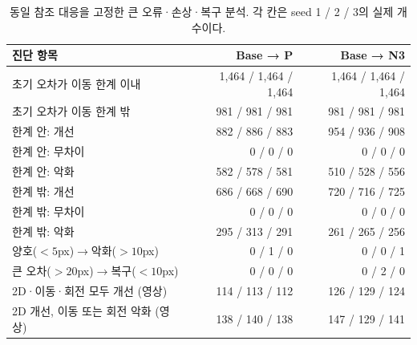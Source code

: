\begin{table}[t]
\centering\footnotesize
\caption{동일 참조 대응을 고정한 큰 오류·손상·복구 분석. 각 칸은 seed 1 / 2 / 3의 실제 개수이다.}
\label{sup:tail}
\setlength{\tabcolsep}{3pt}
\begin{tabularx}{\textwidth}{Yrr}
\toprule
진단 항목 & Base → P & Base → N3 \\
\midrule
초기 오차가 이동 한계 이내 & 1,464 / 1,464 / 1,464 & 1,464 / 1,464 / 1,464 \\
초기 오차가 이동 한계 밖 & 981 / 981 / 981 & 981 / 981 / 981 \\
한계 안: 개선 & 882 / 886 / 883 & 954 / 936 / 908 \\
한계 안: 무차이 & 0 / 0 / 0 & 0 / 0 / 0 \\
한계 안: 악화 & 582 / 578 / 581 & 510 / 528 / 556 \\
한계 밖: 개선 & 686 / 668 / 690 & 720 / 716 / 725 \\
한계 밖: 무차이 & 0 / 0 / 0 & 0 / 0 / 0 \\
한계 밖: 악화 & 295 / 313 / 291 & 261 / 265 / 256 \\
양호($<5$px)$\to$악화($>10$px) & 0 / 1 / 0 & 0 / 0 / 1 \\
큰 오차($>20$px)$\to$복구($<10$px) & 0 / 0 / 0 & 0 / 2 / 0 \\
2D·이동·회전 모두 개선 (영상) & 114 / 113 / 112 & 126 / 129 / 124 \\
2D 개선, 이동 또는 회전 악화 (영상) & 138 / 140 / 138 & 147 / 129 / 141 \\
\bottomrule
\end{tabularx}
\end{table}
